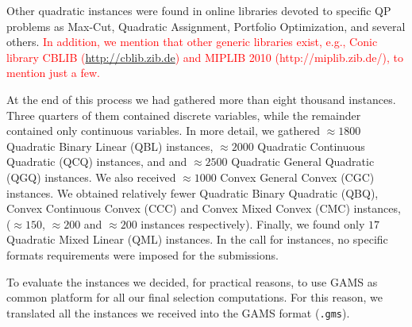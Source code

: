 Other quadratic instances were found in online libraries devoted to
specific QP problems as Max-Cut, Quadratic Assignment, Portfolio
Optimization, and several others. \textcolor{red}{In addition, we mention
that other generic libraries exist, e.g., 
Conic library CBLIB (\url{http://cblib.zib.de}) and 
MIPLIB 2010 (http://miplib.zib.de/), to mention just a few.}

At the end of this process we had gathered more than eight thousand
instances. Three quarters of them contained discrete variables, while
the remainder contained only continuous variables. In more detail,
we gathered $\approx 1800$ Quadratic Binary Linear (QBL) instances,
$\approx 2000$ Quadratic Continuous Quadratic (QCQ) instances, and
and $\approx 2500$ Quadratic General Quadratic (QGQ) instances. We
also received $\approx 1000$ Convex General Convex (CGC) instances. We
obtained relatively fewer Quadratic Binary Quadratic (QBQ), Convex
Continuous Convex (CCC) and Convex Mixed Convex (CMC) instances,
($\approx 150$, $\approx 200$ and $\approx 200$ instances respectively).
Finally, we found only $17$ Quadratic Mixed
Linear (QML) instances. In the call for instances, no specific formats
requirements were imposed for the submissions.

To evaluate the instances we decided, for practical reasons, to use
GAMS as common platform for all our final selection computations.
For this reason, we translated all the
instances we received into the GAMS format (\texttt{.gms}).
%


